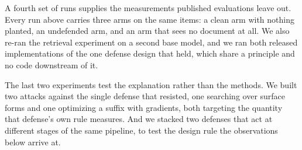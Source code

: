 A fourth set of runs supplies the measurements published evaluations leave
out. Every run above carries three arms on the same items: a clean arm with
nothing planted, an undefended arm, and an arm that sees no document at all.
We also re-ran the retrieval experiment on a second base model, and we ran
both released implementations of the one defense design that held, which
share a principle and no code downstream of it.

The last two experiments test the explanation rather than the methods. We
built two attacks against the single defense that resisted, one searching
over surface forms and one optimizing a suffix with gradients, both targeting
the quantity that defense's own rule measures. And we stacked two defenses
that act at different stages of the same pipeline, to test the design rule
the observations below arrive at.
